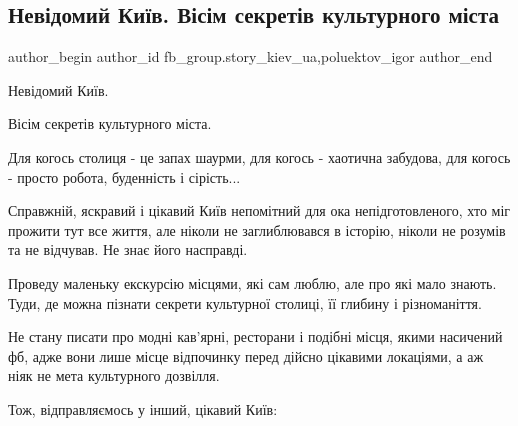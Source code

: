  
 
 
 
 
 
\subsection{Невідомий Київ. Вісім секретів культурного міста}
\label{sec:28_01_2022.fb.fb_group.story_kiev_ua.1.kiev_visim_sekretiv}
 
\ifcmt
 author_begin
   author_id fb_group.story_kiev_ua,poluektov_igor
 author_end
\fi

Невідомий Київ.

Вісім секретів культурного міста.

Для когось столиця - це запах шаурми, для когось - хаотична забудова, для
когось - просто робота, буденність і сірість...

Справжній, яскравий і цікавий Київ непомітний для ока непідготовленого, хто міг
прожити тут все життя, але ніколи не заглиблювався в історію, ніколи не розумів
та не відчував. Не знає його насправді.


Проведу маленьку екскурсію місцями, які сам люблю, але про які мало знають.
Туди, де можна пізнати секрети культурної столиці, її глибину і різноманіття. 

Не стану писати про модні кав’ярні, ресторани і подібні місця, якими насичений
фб, адже вони лише місце відпочинку перед дійсно цікавими локаціями, а аж ніяк
не мета культурного дозвілля. 

Тож, відправляємось у інший, цікавий Київ:




